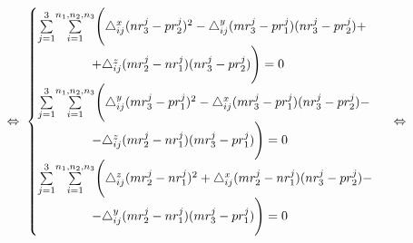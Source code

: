 $$ \Leftrightarrow \; \begin{cases}
	\underset{j=1}{\overset{3}{\sum}} \underset{i=1}{\overset{n_1, n_2, n_3}{\sum}} \Bigg( \triangle_{ij}^x (n r_3^j - p r_2^j)^2 - \triangle_{ij}^y (m r_3^j - p r_1^j) (n r_3^j - p r_2^j) + \\
	\hspace{1.5cm} + \triangle_{ij}^z (m r_2^j - n r_1^j) (n r_3^j - p r_2^j) \Bigg) = 0 \\
	\underset{j=1}{\overset{3}{\sum}} \underset{i=1}{\overset{n_1, n_2, n_3}{\sum}} \Bigg( \triangle_{ij}^y (m r_3^j - p r_1^j)^2 - \triangle_{ij}^x (m r_3^j - p r_1^j) (n r_3^j - p r_2^j) - \\
	\hspace{1.5cm} - \triangle_{ij}^z (m r_2^j - n r_1^j) (m r_3^j - p r_1^j) \Bigg) = 0 \\
	\underset{j=1}{\overset{3}{\sum}} \underset{i=1}{\overset{n_1, n_2, n_3}{\sum}} \Bigg( \triangle_{ij}^z (m r_2^j - n r_1^j)^2 + \triangle_{ij}^x (m r_2^j - n r_1^j) (n r_3^j - p r_2^j) - \\
	\hspace{1.5cm} - \triangle_{ij}^y (m r_2^j - n r_1^j) (m r_3^j - p r_1^j) \Bigg) = 0
\end{cases} \; \Leftrightarrow$$
\hfill \break \hfill \break \hfill \break \hfill \break \hfill \break
\hfill \break \hfill \break \hfill \break
